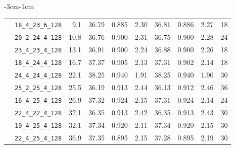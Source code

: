 \documentclass[12pt, a4paper, twoside]{report}
\begin{document}
\begin{table}[htbp]
\begin{adjustwidth}{-3cm}{-1cm}
\begin{tabular}{llrrrrrrrr}
   & \texttt{18\_4\_23\_6\_128} &  9.1 & 36.79 & 0.885 & 2.30 & 36.81 & 0.886 & 2.27 & 18 \\
   & \texttt{20\_2\_24\_4\_128} & 10.8 & 36.76 & 0.900 & 2.31 & 36.75 & 0.900 & 2.28 & 24 \\
   & \texttt{23\_4\_23\_4\_128} & 13.1 & 36.91 & 0.900 & 2.24 & 36.88 & 0.900 & 2.26 & 18 \\
   & \texttt{18\_4\_24\_4\_128} & 16.7 & 37.37 & 0.905 & 2.13 & 37.31 & 0.902 & 2.14 & 18 \\
   & \texttt{24\_4\_24\_4\_128} & 22.1 & 38.25 & 0.940 & 1.91 & 38.25 & 0.940 & 1.90 & 30 \\
   & \texttt{25\_2\_25\_4\_128} & 25.5 & 36.19 & 0.913 & 2.44 & 36.13 & 0.912 & 2.46 & 36 \\
   & \texttt{16\_4\_25\_4\_128} & 26.9 & 37.32 & 0.924 & 2.15 & 37.31 & 0.924 & 2.14 & 24 \\
   & \texttt{22\_4\_22\_4\_128} & 32.1 & 36.35 & 0.913 & 2.42 & 36.35 & 0.913 & 2.43 & 30 \\
   & \texttt{19\_4\_25\_4\_128} & 32.1 & 37.34 & 0.920 & 2.11 & 37.34 & 0.920 & 2.15 & 30 \\
   & \texttt{22\_4\_25\_4\_128} & 36.9 & 37.35 & 0.895 & 2.15 & 37.28 & 0.895 & 2.19 & 30 \\
\bottomrule
\end{tabular}
\end{adjustwidth}
\end{table}
\end{document}
